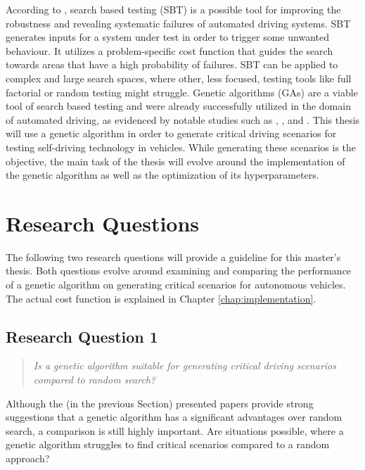 According to \cite{kluck_search-based_2022}, search based testing (SBT) is a possible tool for improving the robustness and revealing systematic failures of automated driving systems. SBT generates inputs for a system under test in order to trigger some unwanted behaviour. It utilizes a problem-specific cost function that guides the search towards areas that have a high probability of failures. SBT can be applied to complex and large search spaces, where other, less focused, testing tools like full factorial or random testing might struggle. Genetic algorithms (GAs) are a viable tool of search based testing and were already successfully utilized in the domain of automated driving, as evidenced by notable studies such as \cite{klampfl_using_nodate}, \cite{felbinger_comparing_2019}, \cite{kaufmann_critical_2021} and \cite{almanee_scenorita_2021}. This thesis will use a genetic algorithm in order to generate critical driving scenarios for testing self-driving technology in vehicles. While generating these scenarios is the objective, the main task of the thesis will evolve around the implementation of the genetic algorithm as well as the optimization of its hyperparameters.

\section{Research Questions}
The following two research questions will provide a guideline for this master's thesis. Both questions evolve around examining and comparing the performance of a genetic algorithm on generating critical scenarios for autonomous vehicles. The actual cost function is explained in Chapter \ref{chap:implementation}.

\subsection{Research Question 1}
\begin{quote}
	\begin{em}
		\textit{Is a genetic algorithm suitable for generating critical driving scenarios compared to random search?}
	\end{em}
\end{quote}

Although the (in the previous Section) presented papers provide strong suggestions that a genetic algorithm has a significant advantages over random search, a comparison is still highly important. Are situations possible, where a genetic algorithm struggles to find critical scenarios compared to a random approach?

